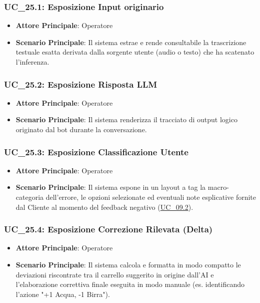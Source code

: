 \subsubsection{UC\_25.1: Esposizione Input originario}
\label{uc_25.1}
\begin{itemize}
    \item \textbf{Attore Principale}: Operatore
    \item \textbf{Scenario Principale}: Il sistema estrae e rende consultabile la trascrizione testuale esatta derivata dalla sorgente utente (audio o testo) che ha scatenato l'inferenza.
\end{itemize}

\subsubsection{UC\_25.2: Esposizione Risposta LLM}
\label{uc_25.2}
\begin{itemize}
    \item \textbf{Attore Principale}: Operatore
    \item \textbf{Scenario Principale}: Il sistema renderizza il tracciato di output logico originato dal bot durante la conversazione.
\end{itemize}

\subsubsection{UC\_25.3: Esposizione Classificazione Utente}
\label{uc_25.3}
\begin{itemize}
    \item \textbf{Attore Principale}: Operatore
    \item \textbf{Scenario Principale}: Il sistema espone in un layout a tag la macro-categoria dell'errore, le opzioni selezionate ed eventuali note esplicative fornite dal Cliente al momento del feedback negativo (\hyperref[uc_09.2]{UC\_09.2}).
\end{itemize}

\subsubsection{UC\_25.4: Esposizione Correzione Rilevata (Delta)}
\label{uc_25.4}
\begin{itemize}
    \item \textbf{Attore Principale}: Operatore
    \item \textbf{Scenario Principale}: Il sistema calcola e formatta in modo compatto le deviazioni riscontrate tra il carrello suggerito in origine dall'AI e l'elaborazione correttiva finale eseguita in modo manuale (es. identificando l'azione "+1 Acqua, -1 Birra").
\end{itemize}

